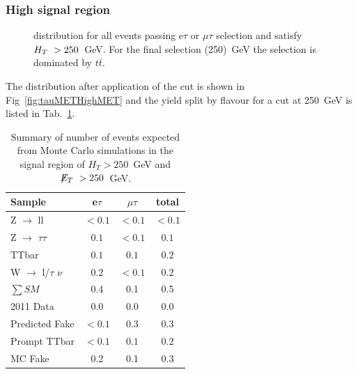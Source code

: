 \subsubsection{High \MET signal region}
\begin{figure}[hbtp]
  \hfill
  \caption{\MET distribution for all events passing e$\tau$ or $\mu\tau$ selection and satisfy $H_T~> 250$~GeV. For the final \MET selection (250)~GeV the selection is dominated by $t\bar{t}$.}
\end{figure}

The \MET distribution after application of the \HT
cut is shown in Fig~\ref{fig:tauMETHighMET} and
the yield split by flavour for a cut at 250~GeV is listed in Tab.~\ref{tab:tauHighMET}.

\begin{table}[htb]
\begin{center}
\caption{\label{tab:tauHighMET}\protect Summary of number of events expected from Monte Carlo simulations in 
the signal region of $H_T> 250$~GeV and $\displaystyle{\not} E_T~> 250$~GeV.}
\begin{tabular}{l|c c |c}
Sample & e$\tau$ & $\mu\tau$ & total\\
\hline
Z $\rightarrow$ ll & $< 0.1$ & $< 0.1$ & $< 0.1$\\
Z $\rightarrow$ $\tau$$\tau$ & $0.1$ & $< 0.1$ & $0.1$\\
TTbar & $0.1$ & $0.1$ & $0.2$\\
W $\rightarrow$ l/$\tau$ $\nu$ & $0.2$ & $< 0.1$ & $0.2$\\
$\sum SM$ & 0.4 & 0.1 & 0.5\\
\hline
2011 Data & $0.0$ & $0.0$ & $0.0$\\
\hline
\hline
Predicted Fake & $< 0.1$ & $0.3$ & $0.3$\\
Prompt TTbar & $< 0.1$ & $0.1$ & $0.2$\\
\hline
MC Fake & 0.2 & 0.1 & 0.3\\
\end{tabular}
\end{center}
\end{table}

